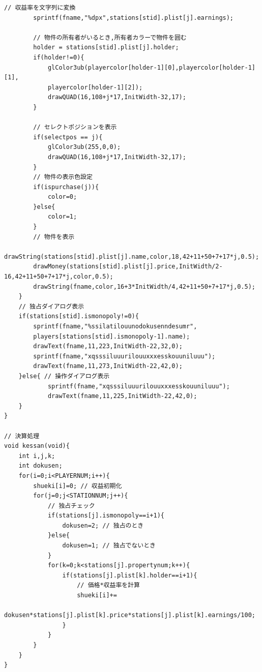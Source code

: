 \documentclass[a4j]{jarticle}
\begin{document}
\begin{lstlisting}[basicstyle=\ttfamily\footnotesize, frame=single,label=code2,caption=game.c]
        // 収益率を文字列に変換
        sprintf(fname,"%dpx",stations[stid].plist[j].earnings);
        
        // 物件の所有者がいるとき,所有者カラーで物件を囲む
        holder = stations[stid].plist[j].holder;
        if(holder!=0){
            glColor3ub(playercolor[holder-1][0],playercolor[holder-1][1],
            playercolor[holder-1][2]);
            drawQUAD(16,108+j*17,InitWidth-32,17);
        }

        // セレクトポジションを表示
        if(selectpos == j){
            glColor3ub(255,0,0);
            drawQUAD(16,108+j*17,InitWidth-32,17);                 
        }
        // 物件の表示色設定
        if(ispurchase(j)){
            color=0;
        }else{
            color=1;
        }
        // 物件を表示
        drawString(stations[stid].plist[j].name,color,18,42+11+50+7+17*j,0.5);
        drawMoney(stations[stid].plist[j].price,InitWidth/2-16,42+11+50+7+17*j,color,0.5);
        drawString(fname,color,16+3*InitWidth/4,42+11+50+7+17*j,0.5);
    }
    // 独占ダイアログ表示
    if(stations[stid].ismonopoly!=0){
        sprintf(fname,"%ssilatilouunodokusenndesumr",
        players[stations[stid].ismonopoly-1].name);
        drawText(fname,11,223,InitWidth-22,32,0);
        sprintf(fname,"xqsssiluuurilouuxxxesskouuniluuu");
        drawText(fname,11,273,InitWidth-22,42,0);
    }else{ // 操作ダイアログ表示
            sprintf(fname,"xqsssiluuurilouuxxxesskouuniluuu");
            drawText(fname,11,225,InitWidth-22,42,0);
    }
}

// 決算処理
void kessan(void){
    int i,j,k;
    int dokusen;
    for(i=0;i<PLAYERNUM;i++){
        shueki[i]=0; // 収益初期化
        for(j=0;j<STATIONNUM;j++){
            // 独占チェック
            if(stations[j].ismonopoly==i+1){
                dokusen=2; // 独占のとき
            }else{
                dokusen=1; // 独占でないとき
            }
            for(k=0;k<stations[j].propertynum;k++){
                if(stations[j].plist[k].holder==i+1){
                    // 価格*収益率を計算
                    shueki[i]+=
                    dokusen*stations[j].plist[k].price*stations[j].plist[k].earnings/100;
                }
            }
        }
    }
}


\end{lstlisting}
\end{document}
